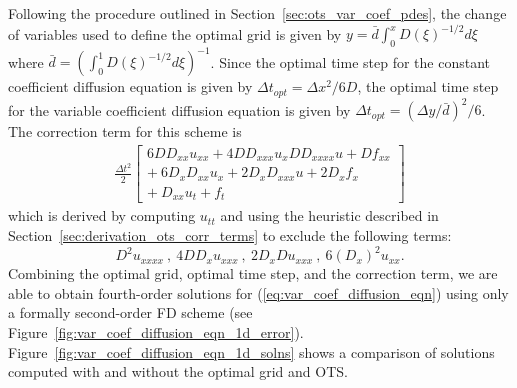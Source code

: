 \documentclass[twocolumn]{article} %
\newcommand{\beq}{\begin{equation}}
\newcommand{\eeq}{\end{equation}}
\newcommand{\bea}{\begin{eqnarray}}
\newcommand{\eea}{\end{eqnarray}}
\def\dbar{\bar{d}}
\def\dt{\Delta t}
\def\dx{\Delta x}
\def\dy{\Delta y}
\def\dto{\Delta t_{opt}}
\begin{document}
Following the procedure outlined in Section~\ref{sec:ots_var_coef_pdes}, the
change of variables used to define the optimal grid is given by
$y = \dbar\int_0^x D(\xi)^{-1/2} d\xi$ where
$\dbar = \left(\int_0^1 D(\xi)^{-1/2} d\xi \right) ^ {-1}$.
Since the optimal time step for the constant coefficient diffusion equation 
is given by $\dto = \dx^2/6D$, the optimal time step for the variable
coefficient diffusion equation is given by $\dto = \left(\dy/\dbar\right)^2/6$.
The correction term for this scheme is 
\bea
  \frac{\dt^2}{2} \left[
  \begin{array}{c}
  6 D D_{xx} u_{xx} + 4 D D_{xxx} u_x D D_{xxxx} u + D f_{xx} \\
  + \ 6 D_x D_{xx} u_x + 2 D_x D_{xxx} u + 2 D_x f_x \\
  + \ D_{xx} u_t + f_t
  \end{array}
  \right]
\eea
which is derived by computing $u_{tt}$ and using the heuristic described in 
Section~\ref{sec:derivation_ots_corr_terms} to exclude the following terms:
\beq
  D^2u_{xxxx} \ , \ 4 D D_x u_{xxx} \ , \ 
  2 D_x D u_{xxx} \ , \ 6 \left(D_x\right)^2 u_{xx}.
\eeq
Combining the optimal grid, optimal time step, and the correction term, we are 
able to obtain fourth-order solutions for (\ref{eq:var_coef_diffusion_eqn})
using only a formally second-order FD scheme (see 
Figure~\ref{fig:var_coef_diffusion_eqn_1d_error}).  
Figure~\ref{fig:var_coef_diffusion_eqn_1d_solns} shows a comparison of 
solutions computed with and without the optimal grid and OTS.
\end{document}
